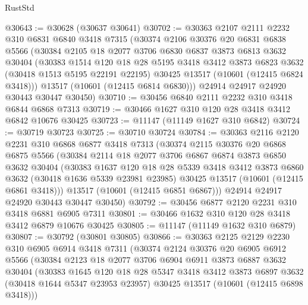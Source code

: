 \begin{lexlean}{RustStd}
\begin{coremodule}
@30643 := @30628 (@30637 @30641)
@30702 := @30363
    @2107
    @2111
    @2232
    @310
    @6831
    @6840
    @3418
    @7315
    (@30374
      @2106
      @30376
      @20
      @6831
      @6838
      @5566
      (@30384
        @2105
        @18
        @2077
        @3706
        @6830
        @6837
        @3873
        @6813
        @3632
        @30404
        (@30383
          @1514
          @120
          @18
          @28
          @5195
          @3418
          @3412
          @3873
          @6823
          @3632
          (@30418 @1513 @5195 @22191 @22195)
          @30425
          @13517
          (@10601 (@12415 @6824 @3418)))
        @13517
        (@10601 (@12415 @6814 @6830)))
      @24914
      @24917
      @24920
      @30443
      @30447
      @30450)
@30710 := @30456 @6840 @2111 @2232 @310 @3418 @6844 @6868 @7313
@30719 := @30466 @1627 @310 @120 @28 @3418 @3412 @6842 @10676 @30425
@30723 := @11147 (@11149 @1627 @310 @6842)
@30724 := @30719 @30723
@30725 := @30710 @30724
@30784 := @30363
    @2116
    @2120
    @2231
    @310
    @6868
    @6877
    @3418
    @7313
    (@30374
      @2115
      @30376
      @20
      @6868
      @6875
      @5566
      (@30384
        @2114
        @18
        @2077
        @3706
        @6867
        @6874
        @3873
        @6850
        @3632
        @30404
        (@30383
          @1637
          @120
          @18
          @28
          @5339
          @3418
          @3412
          @3873
          @6860
          @3632
          (@30418 @1636 @5339 @23981 @23985)
          @30425
          @13517
          (@10601 (@12415 @6861 @3418)))
        @13517
        (@10601 (@12415 @6851 @6867)))
      @24914
      @24917
      @24920
      @30443
      @30447
      @30450)
@30792 := @30456 @6877 @2120 @2231 @310 @3418 @6881 @6905 @7311
@30801 := @30466 @1632 @310 @120 @28 @3418 @3412 @6879 @10676 @30425
@30805 := @11147 (@11149 @1632 @310 @6879)
@30807 := @30792 (@30801 @30805)
@30866 := @30363
    @2125
    @2129
    @2230
    @310
    @6905
    @6914
    @3418
    @7311
    (@30374
      @2124
      @30376
      @20
      @6905
      @6912
      @5566
      (@30384
        @2123
        @18
        @2077
        @3706
        @6904
        @6911
        @3873
        @6887
        @3632
        @30404
        (@30383
          @1645
          @120
          @18
          @28
          @5347
          @3418
          @3412
          @3873
          @6897
          @3632
          (@30418 @1644 @5347 @23953 @23957)
          @30425
          @13517
          (@10601 (@12415 @6898 @3418)))

\end{coremodule}
\end{lexlean}
